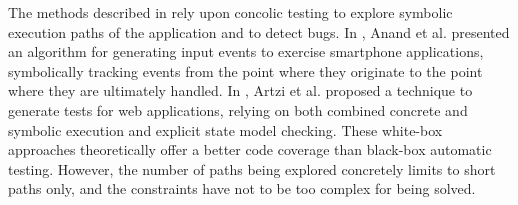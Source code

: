 The methods described in \cite{concolicandroid12,5416728} rely
upon concolic testing to explore symbolic execution paths of the
application and to detect bugs. In \cite{concolicandroid12},
Anand et al. presented an algorithm for generating input events
to exercise smartphone applications, symbolically tracking events
from the point where they originate to the point where they are
ultimately handled. In \cite{5416728}, Artzi et al. proposed a
technique to generate tests for web applications, relying on both
combined concrete and symbolic execution and explicit state model
checking. These white-box approaches theoretically offer a better
code coverage than black-box automatic testing. However, the
number of paths being explored concretely limits to short paths
only, and the constraints have not to be too complex for being
solved.
